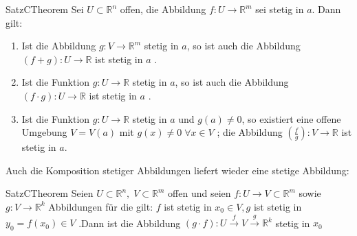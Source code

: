 \documentclass[a4paper]{memoir}
\begin{document}
\begin{ibox}[18]{Satz}{CTheorem}
	Sei $ U \subset \mathbb{R}^n  $ offen, die Abbildung $ f : U \to \mathbb{R}^m $ sei stetig in $ a $. Dann gilt:
	\begin{enumerate}[label=\alph*)]
		\item Ist die Abbildung $ g: V \to \mathbb{R}^m $ stetig in $ a $, so ist auch die Abbildung
			$ (f+g):U \to \mathbb{R}  $ ist stetig in $ a $ .
 		\item Ist die Funktion $ g: U \to \mathbb{R}  $ stetig in $ a $, so ist auch die Abbildung
			 $ (f \cdot g) : U \to \mathbb{R}  $ ist stetig in $ a $ .
		\item Ist die Funktion $ g: U \to \mathbb{R}  $ stetig in $ a  $ und  $ g(a) \neq 0 $, so existiert eine offene Umgebung 
			$ V = V(a) $ mit $ g(x) \neq 0 \; \forall x \in V $ ; die Abbildung 
			$ \left( \frac{f}{g}\right) : V \to \mathbb{R}    $ ist stetig in $ a $.  
	\end{enumerate}
\end{ibox}

Auch die Komposition stetiger Abbildungen liefert wieder eine stetige Abbildung:

\begin{ibox}[19]{Satz}{CTheorem}
    Seien $ U \subset \mathbb{R}^n , \; V \subset \mathbb{R}^m $ offen und seien $ f: U \to V \subset \mathbb{R}^m $ sowie
	$ g: V \to \mathbb{R}^k $ Abbildungen für die gilt: $ f $ ist stetig in $ x_0 \in V, g  $ ist stetig in $ y_0 = f \left( x_0 \right) 
	\in V$ .Dann ist die Abbildung $ \left( g \cdot f \right) : U \xrightarrow{f} V \xrightarrow{g} \mathbb{R}^k  $ stetig in $ x_0 $  
\end{ibox}
\end{document}
